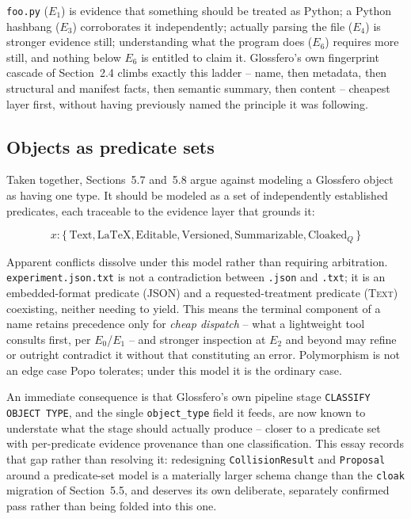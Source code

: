 \documentclass[11pt]{article}
\begin{document}
\texttt{foo.py} ($E_1$) is evidence that something should be treated as Python; a Python hashbang ($E_3$) corroborates it independently; actually parsing the file ($E_4$) is stronger evidence still; understanding what the program does ($E_6$) requires more still, and nothing below $E_6$ is entitled to claim it. Glossfero's own fingerprint cascade of Section~2.4 climbs exactly this ladder -- name, then metadata, then structural and manifest facts, then semantic summary, then content -- cheapest layer first, without having previously named the principle it was following.

\subsection{Objects as predicate sets}

Taken together, Sections~5.7 and~5.8 argue against modeling a Glossfero object as having one type. It should be modeled as a set of independently established predicates, each traceable to the evidence layer that grounds it:

\begin{equation}
x : \{\, \mathrm{Text}, \mathrm{LaTeX}, \mathrm{Editable}, \mathrm{Versioned}, \mathrm{Summarizable}, \mathrm{Cloaked}_Q \,\}
\end{equation}

Apparent conflicts dissolve under this model rather than requiring arbitration. \texttt{experiment.json.txt} is not a contradiction between \texttt{.json} and \texttt{.txt}; it is an embedded-format predicate (\textsc{JSON}) and a requested-treatment predicate (\textsc{Text}) coexisting, neither needing to yield. This means the terminal component of a name retains precedence only for \emph{cheap dispatch} -- what a lightweight tool consults first, per $E_0$/$E_1$ -- and stronger inspection at $E_2$ and beyond may refine or outright contradict it without that constituting an error. Polymorphism is not an edge case Popo tolerates; under this model it is the ordinary case.

An immediate consequence is that Glossfero's own pipeline stage \texttt{CLASSIFY OBJECT TYPE}, and the single \texttt{object\_type} field it feeds, are now known to understate what the stage should actually produce -- closer to a predicate set with per-predicate evidence provenance than one classification. This essay records that gap rather than resolving it: redesigning \texttt{CollisionResult} and \texttt{Proposal} around a predicate-set model is a materially larger schema change than the \texttt{cloak} migration of Section~5.5, and deserves its own deliberate, separately confirmed pass rather than being folded into this one.
\end{document}
